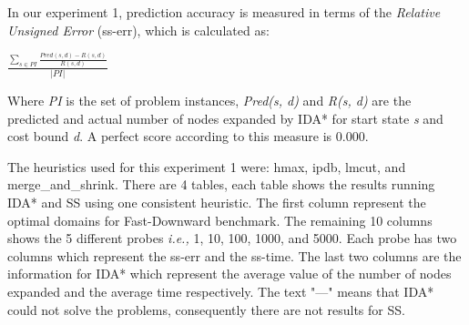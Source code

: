 \documentclass[a4paper,12pt]{article}
\begin{document}
In our experiment 1, prediction accuracy is measured in terms of the \textit{Relative Unsigned Error} (ss-err), which is calculated as:


\begin{center}
$
\frac{\sum_{s\in PI} \frac{Pred(s, d) - R(s, d)}{R(s, d)}}{|PI|}
$
\end{center}

Where \textit{PI} is the set of problem instances, \textit{Pred(s, d)} and \textit{R(s, d)} are the predicted and actual number of nodes expanded by IDA* for start state \textit{s} and cost bound \textit{d}. A perfect score according to this measure is 0.000.


The heuristics used for this experiment 1 were: hmax, ipdb, lmcut, and {merge\_and\_shrink}. There are 4 tables, each table shows the results running IDA* and SS using one consistent heuristic. The first column represent the optimal domains for Fast-Downward benchmark. The remaining 10 columns shows the 5 different probes \textit{i.e.,} 1, 10, 100, 1000, and 5000. Each probe has two columns which represent the ss-err and the ss-time. The last two columns are the information for IDA* which represent the average value of the number of nodes expanded and the average time respectively. The text "---" means that IDA* could not solve the problems, consequently there are not results for SS.
\end{document}
